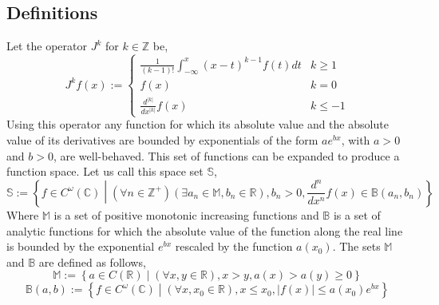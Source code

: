 \documentclass[%
 onecolumn,
 amsmath, amssymb, aps, pra, 10pt
]{revtex4-2}
\begin{document}
\subsection{Definitions}
Let the operator $J^k$ for $k \in \mathbb{Z}$ be,
\begin{equation}
J^k f(x) := \begin{cases} \frac{1}{(k-1)!}\int_{-\infty}^x (x - t)^{k - 1}f(t)dt & k \geq 1 \\ f(x) & k = 0 \\ \frac{d^{\left|k\right|}}{dx^{\left|k\right|}}f(x) & k \leq -1 \end{cases}
\label{integer_calculus}
\end{equation}
Using this operator any function for which its absolute value and the absolute value of its derivatives are bounded by exponentials of the form $ae^{bx}$, with $a > 0$ and $b > 0$, are well-behaved. This set of functions can be expanded to produce a function space. Let us call this space set $\mathbb{S}$,
\begin{equation}
\mathbb{S} := \left\lbrace f \in C^\omega(\mathbb{C}) \middle| (\forall n \in \mathbb{Z}^+)(\exists a_n \in \mathbb{M}, b_n \in \mathbb{R}), b_n > 0, \frac{d^n}{dx^n}f(x) \in \mathbb{B}(a_n, b_n) \right\rbrace
\label{exponentialy_bounded}
\end{equation}
Where $\mathbb{M}$ is a set of positive monotonic increasing functions and $\mathbb{B}$ is a set of analytic functions for which the absolute value of the function along the real line is bounded by the exponential $e^{bx}$ rescaled by the function $a(x_0)$. The sets $\mathbb{M}$ and $\mathbb{B}$ are defined as follows,
\[\mathbb{M} := \left\lbrace a \in C(\mathbb{R}) \middle| (\forall x, y \in \mathbb{R}), x > y, a(x) > a(y) \geq 0 \right\rbrace\]
\[\mathbb{B}(a, b) := \left\lbrace f \in C^\omega(\mathbb{C}) \middle| (\forall x, x_0 \in \mathbb{R}), x \leq x_0, |f(x)| \leq a(x_0)e^{bx} \right\rbrace\]
\end{document}

